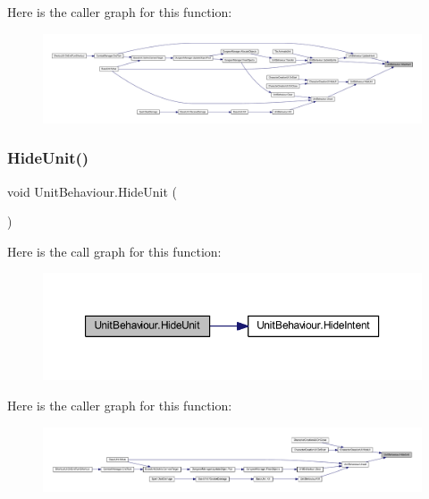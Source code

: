 Here is the caller graph for this function\+:
\nopagebreak
\begin{figure}[H]
\begin{center}
\leavevmode
\includegraphics[width=350pt]{class_unit_behaviour_a9ba9de594c111333c048b477dd295025_icgraph}
\end{center}
\end{figure}
\mbox{\label{class_unit_behaviour_aaf48af005978a326a61c98905630e469}} 
\subsubsection{\texorpdfstring{HideUnit()}{HideUnit()}}
{\footnotesize\ttfamily void Unit\+Behaviour.\+Hide\+Unit (\begin{DoxyParamCaption}{ }\end{DoxyParamCaption})}

Here is the call graph for this function\+:
\nopagebreak
\begin{figure}[H]
\begin{center}
\leavevmode
\includegraphics[width=350pt]{class_unit_behaviour_aaf48af005978a326a61c98905630e469_cgraph}
\end{center}
\end{figure}
Here is the caller graph for this function\+:
\nopagebreak
\begin{figure}[H]
\begin{center}
\leavevmode
\includegraphics[width=350pt]{class_unit_behaviour_aaf48af005978a326a61c98905630e469_icgraph}
\end{center}
\end{figure}
\mbox{\label{class_unit_behaviour_a9a32f3234ea6b89f686c6cd55d924348}} 
